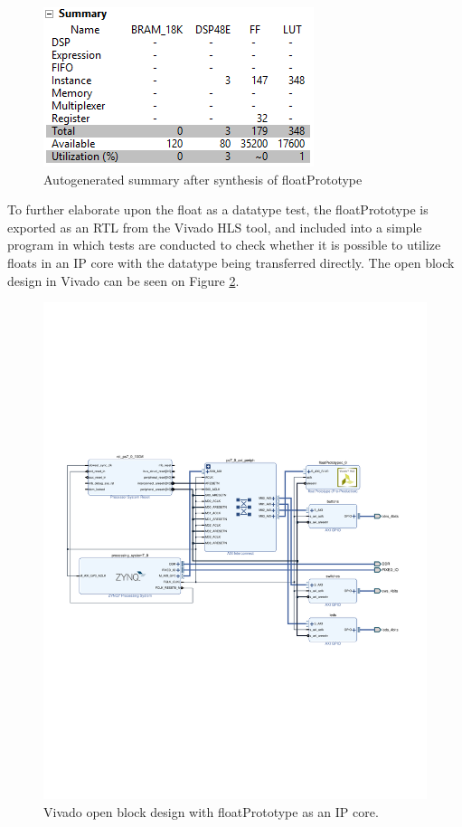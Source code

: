\begin{figure}[H]
	\centering
	\includegraphics[width=0.5\linewidth]{diagram/floatPrototype_synthesis_summary}
	\caption{Autogenerated summary after synthesis of floatPrototype}
	\label{fig:floatprototypesynthesissummary}
\end{figure}


To further elaborate upon the float as a datatype test, the floatPrototype is exported as an RTL from the Vivado HLS tool, and included into a simple program in which tests are conducted to check whether it is possible to utilize floats in an IP core with the datatype being transferred directly. The open block design in Vivado can be seen on Figure \ref{fig:vivadoblockdesignwithipcore}.\\

\begin{figure}[H]
	\centering
	\includegraphics[trim={0 240 0 240},clip,width=1\linewidth]{diagram/VivadoBlockDesign_with_ip_core}
	\caption{Vivado open block design with floatPrototype as an IP core.}
	\label{fig:vivadoblockdesignwithipcore}
\end{figure}

